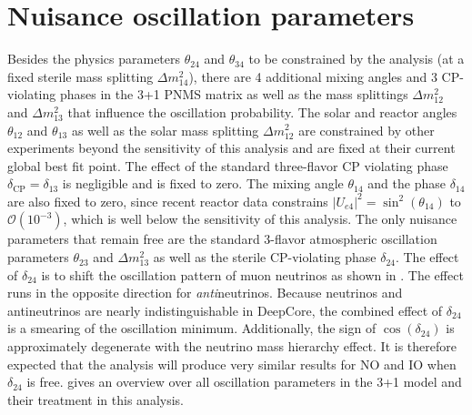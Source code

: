 \section{Nuisance oscillation parameters}
Besides the physics parameters $\theta_{24}$ and $\theta_{34}$ to be constrained by the analysis (at a fixed sterile mass splitting $\Delta m^2_{14}$), there are 4 additional mixing angles and 3 CP-violating phases in the 3+1 PNMS matrix as well as the mass splittings $\Delta m^2_{12}$ and $\Delta m^2_{13}$ that influence the oscillation probability. The solar and reactor angles $\theta_{12}$ and $\theta_{13}$ as well as the solar mass splitting $\Delta m^2_{12}$ are constrained by other experiments beyond the sensitivity of this analysis and are fixed at their current global best fit point. The effect of the standard three-flavor CP violating phase $\delta_{\mathrm{CP}}=\delta_{13}$ is negligible and is fixed to zero.
The mixing angle $\theta_{14}$ and the phase $\delta_{14}$ are also fixed to zero, since recent reactor data constrains $|U_{e4}|^2 = \sin^2(\theta_{14})$ to $\mathcal{O}(10^{-3})$, which is well below the sensitivity of this analysis.
The only nuisance parameters that remain free are the standard 3-flavor atmospheric oscillation parameters $\theta_{23}$ and $\Delta m^2_{13}$ as well as the sterile CP-violating phase $\delta_{24}$.
The effect of $\delta_{24}$ is to shift the oscillation pattern of muon neutrinos as shown in .
The effect runs in the opposite direction for \emph{anti}neutrinos.
Because neutrinos and antineutrinos are nearly indistinguishable in DeepCore, the combined effect of $\delta_{24}$ is a smearing of the oscillation minimum.
Additionally, the sign of $\cos(\delta_{24})$ is approximately degenerate with the neutrino mass hierarchy effect.
It is therefore expected that the analysis will produce very similar results for NO and IO when $\delta_{24}$ is free.
 gives an overview over all oscillation parameters in the 3+1 model and their treatment in this analysis.
